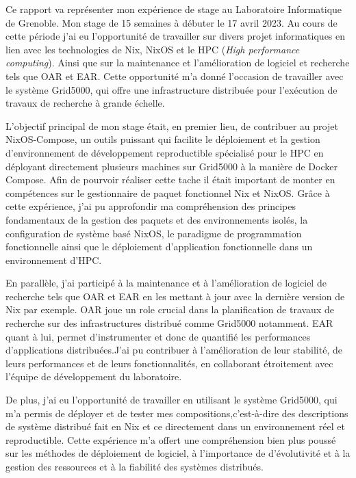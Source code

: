 \documentclass[a4paper,french,12pt, titlepage]{article}
\begin{document}
Ce rapport va représenter mon expérience de stage au Laboratoire
Informatique de Grenoble. Mon stage de 15 semaines à débuter le 17 avril
2023. Au cours de cette période j'ai eu l'opportunité de travailler sur
divers projet informatiques en lien avec les technologies de Nix, NixOS
et le HPC (\emph{High performance computing}). Ainsi que sur la
maintenance et l'amélioration de logiciel et recherche tels que OAR et
EAR. Cette opportunité m'a donné l'occasion de travailler avec le
système Grid5000, qui offre une infrastructure distribuée pour
l'exécution de travaux de recherche à grande échelle.\newline

L'objectif principal de mon stage était, en premier lieu, de contribuer
au projet NixOS-Compose, un outils puissant qui facilite le déploiement
et la gestion d'environnement de développement reproductible spécialisé
pour le HPC en déployant directement plusieurs machines sur Grid5000 à
la manière de Docker Compose. Afin de pourvoir réaliser cette tache il
était important de monter en compétences sur le gestionnaire de paquet
fonctionnel Nix et NixOS. Grâce à cette expérience, j'ai pu approfondir
ma compréhension des principes fondamentaux de la gestion des paquets et
des environnements isolés, la configuration de système basé NixOS, le
paradigme de programmation fonctionnelle ainsi que le déploiement
d'application fonctionnelle dans un environnement d'HPC.\newline

En parallèle, j'ai participé à la maintenance et à l'amélioration de
logiciel de recherche tels que OAR et EAR en les mettant à jour avec la
dernière version de Nix par exemple. OAR joue un role crucial dans la
planification de travaux de recherche sur des infrastructures distribué
comme Grid5000 notamment. EAR quant à lui, permet d'instrumenter et donc
de quantifié les performances d'applications distribuées.J'ai pu
contribuer à l'amélioration de leur stabilité, de leurs performances et
de leurs fonctionnalités, en collaborant étroitement avec l'équipe de
développement du laboratoire.\newline

De plus, j'ai eu l'opportunité de travailler en utilisant le système
Grid5000, qui m'a permis de déployer et de tester mes
compositions,c'est-à-dire des descriptions de système distribué fait en
Nix et ce directement dans un environnement réel et reproductible. Cette
expérience m'a offert une compréhension bien plus poussé sur les
méthodes de déploiement de logiciel, à l'importance de d'évolutivité et
à la gestion des ressources et à la fiabilité des systèmes
distribués.\newline
\end{document}
